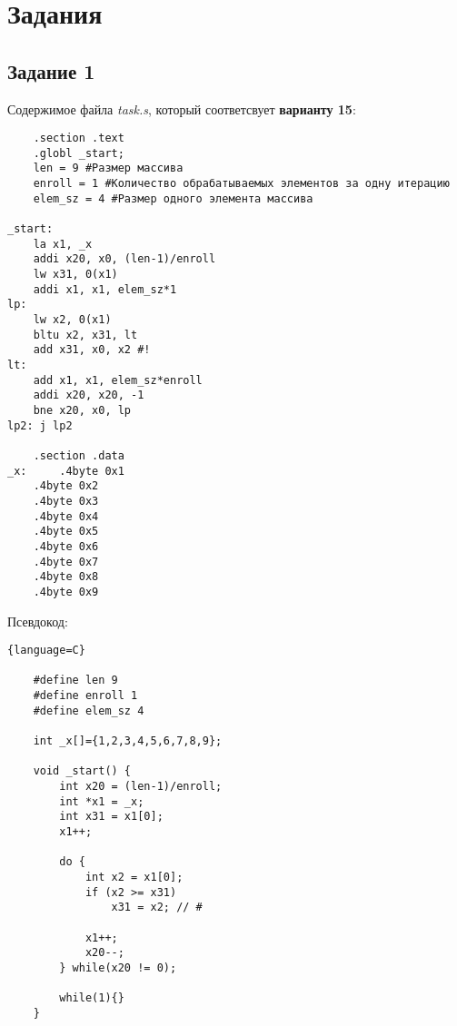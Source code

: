 \chapter{Задания} 
\section{Задание 1}

Содержимое файла \textit{task.s}, который соответсвует \textbf{варианту 15}:
\begin{lstlisting}
    .section .text
    .globl _start;
    len = 9 #Размер массива
    enroll = 1 #Количество обрабатываемых элементов за одну итерацию
    elem_sz = 4 #Размер одного элемента массива

_start:
    la x1, _x
    addi x20, x0, (len-1)/enroll
    lw x31, 0(x1)
    addi x1, x1, elem_sz*1
lp:
    lw x2, 0(x1)
    bltu x2, x31, lt
    add x31, x0, x2 #!
lt:
    add x1, x1, elem_sz*enroll
    addi x20, x20, -1
    bne x20, x0, lp
lp2: j lp2

    .section .data
_x:     .4byte 0x1
    .4byte 0x2
    .4byte 0x3
    .4byte 0x4
    .4byte 0x5
    .4byte 0x6
    .4byte 0x7
    .4byte 0x8
    .4byte 0x9

\end{lstlisting}

Псевдокод:
\begin{lstlisting}{language=C}

    #define len 9
    #define enroll 1
    #define elem_sz 4

    int _x[]={1,2,3,4,5,6,7,8,9};

    void _start() {
        int x20 = (len-1)/enroll;
        int *x1 = _x;
        int x31 = x1[0];
        x1++;
    
        do {
            int x2 = x1[0];
            if (x2 >= x31)
                x31 = x2; // #
            
            x1++;
            x20--;
        } while(x20 != 0);

        while(1){}
    }

\end{lstlisting}

